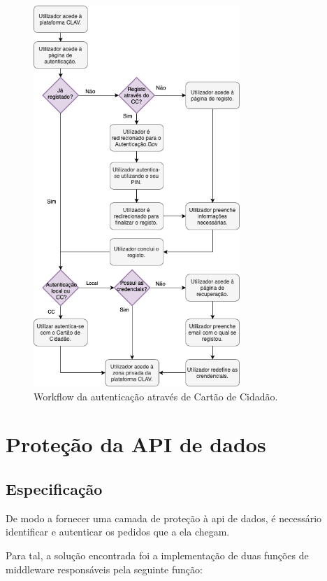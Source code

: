 \begin{figure}[h!]
    \centering
    \includegraphics[width=0.695\textwidth]{img/diagramas/authCC/AuthCC.png}
    \caption{Workflow da autenticação através de Cartão de Cidadão.}
    \label{fig:flow_authCC}
\end{figure}

\cleardoublepage
\section{Proteção da API de dados}

\subsection{Especificação}

De modo a fornecer uma camada de proteção à \gls{api} de dados, é necessário identificar e autenticar os pedidos que a ela chegam.

Para tal, a solução encontrada foi a implementação de duas funções de middleware responsáveis pela seguinte função:

